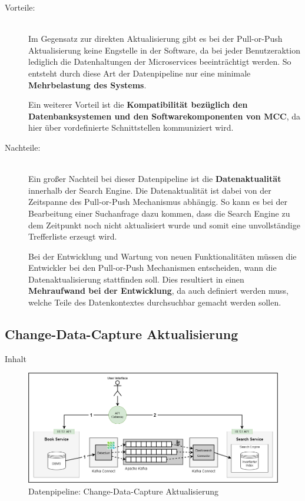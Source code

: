 \begin{description}
    \item[Vorteile:]\hfill \\
    Im Gegensatz zur direkten Aktualisierung gibt es bei der Pull-or-Push Aktualisierung keine Engstelle in der Software, da bei jeder Benutzeraktion lediglich die Datenhaltungen der Microservices beeinträchtigt werden. So entsteht durch diese Art der Datenpipeline nur eine minimale \textbf{Mehrbelastung des Systems}.

    Ein weiterer Vorteil ist die \textbf{Kompatibilität bezüglich den Datenbanksystemen und den Softwarekomponenten von MCC}, da hier über vordefinierte Schnittstellen kommuniziert wird.
    
    \item[Nachteile:]\hfill \\
    Ein großer Nachteil bei dieser Datenpipeline ist die \textbf{Datenaktualität} innerhalb der Search Engine. Die Datenaktualität ist dabei von der Zeitspanne des Pull-or-Push Mechanismus abhängig. So kann es bei der Bearbeitung einer Suchanfrage dazu kommen, dass die Search Engine zu dem Zeitpunkt noch nicht aktualisiert wurde und somit eine unvollständige Trefferliste erzeugt wird.

    Bei der Entwicklung und Wartung von neuen Funktionalitäten müssen die Entwickler bei den Pull-or-Push Mechanismen entscheiden, wann die Datenaktualisierung stattfinden soll. Dies resultiert in einen \textbf{Mehraufwand bei der Entwicklung}, da auch definiert werden muss, welche Teile des Datenkontextes \glqq durchsuchbar\grqq{} gemacht werden sollen.

\end{description}

\subsection{Change-Data-Capture Aktualisierung\label{subsec4.3.4:Unterunterpunkt-4}}

Inhalt

\begin{figure}[H]
    \centering
    \includegraphics[width=0.9\linewidth]{images/CDC_aktualisierung.png}
    \caption{Datenpipeline: Change-Data-Capture Aktualisierung}
    \label{fig:changedatacapture_aktualisierung}
\end{figure}

